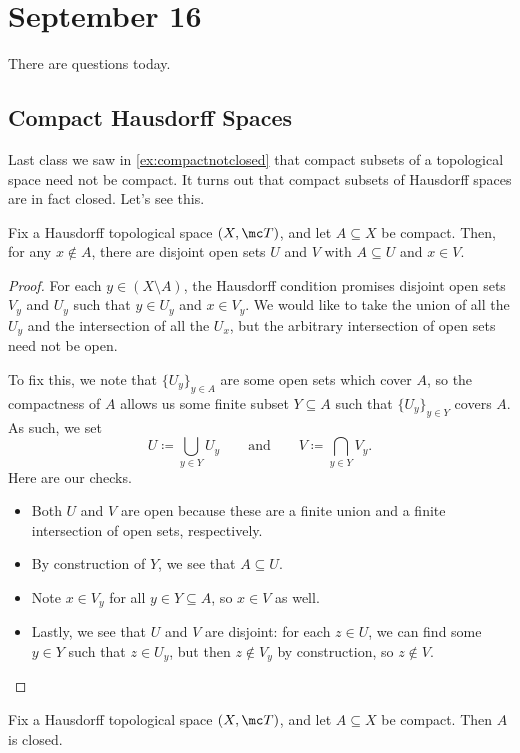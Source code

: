 \documentclass[../notes.tex]{subfiles}
\begin{document}
\section{September 16}

There are questions today.

\subsection{Compact Hausdorff Spaces}
Last class we saw in \autoref{ex:compactnotclosed} that compact subsets of a topological space need not be compact. It turns out that compact subsets of Hausdorff spaces are in fact closed. Let's see this.
\begin{lemma} \label{lem:separationforcompacthaus}
	Fix a Hausdorff topological space $(X,\mc T)$, and let $A\subseteq X$ be compact. Then, for any $x\notin A$, there are disjoint open sets $U$ and $V$ with $A\subseteq U$ and $x\in V$.
\end{lemma}
\begin{proof}
	For each $y\in(X\setminus A)$, the Hausdorff condition promises disjoint open sets $V_y$ and $U_y$ such that $y\in U_y$ and $x\in V_y$. We would like to take the union of all the $U_y$ and the intersection of all the $U_x$, but the arbitrary intersection of open sets need not be open.

	To fix this, we note that $\{U_y\}_{y\in A}$ are some open sets which cover $A$, so the compactness of $A$ allows us some finite subset $Y\subseteq A$ such that $\{U_y\}_{y\in Y}$ covers $A$. As such, we set
	\[U\coloneqq\bigcup_{y\in Y}U_y\qquad\text{and}\qquad V\coloneqq\bigcap_{y\in Y}V_y.\]
	Here are our checks.
	\begin{itemize}
		\item Both $U$ and $V$ are open because these are a finite union and a finite intersection of open sets, respectively.
		\item By construction of $Y$, we see that $A\subseteq U$.
		\item Note $x\in V_y$ for all $y\in Y\subseteq A$, so $x\in V$ as well.
		\item Lastly, we see that $U$ and $V$ are disjoint: for each $z\in U$, we can find some $y\in Y$ such that $z\in U_y$, but then $z\notin V_y$ by construction, so $z\notin V$.
		\qedhere
	\end{itemize}
\end{proof}
\begin{corollary} \label{cor:compact-in-haus-is-closed}
	Fix a Hausdorff topological space $(X,\mc T)$, and let $A\subseteq X$ be compact. Then $A$ is closed.
\end{corollary}
\end{document}
